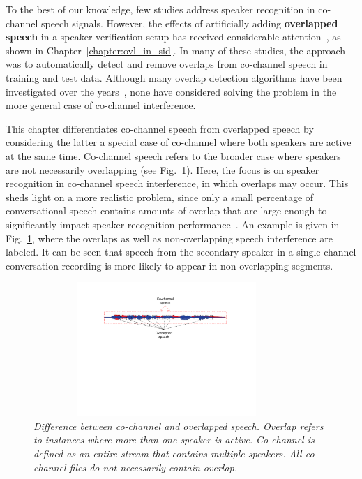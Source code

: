 To the best of our knowledge, few studies address speaker recognition in co-channel speech signals. 
However, the effects of artificially adding {\bf overlapped speech} in a speaker verification setup has received considerable attention~\cite{yantorno_report,yantorno_SID,Dwang_03}, as shown in Chapter~\ref{chapter:ovl_in_sid}. 
In many of these studies, the approach was to automatically detect and remove overlaps from co-channel speech in training and test data. 
Although many overlap detection algorithms have been investigated over the years~\cite{Boakye_icassp_08,nav_icassp13,smolenski_tut,sapvr_2000}, none have considered solving the problem in the more general case of co-channel interference. 

This chapter differentiates co-channel speech from overlapped speech by considering the latter a special case of co-channel where both speakers are active at the same time. 
Co-channel speech refers to the broader case where speakers are not necessarily overlapping (see Fig.~\ref{fig:cochannel_vs_overlap}). 
Here, the focus is on speaker recognition in co-channel speech interference, in which overlaps may occur.  
This sheds light on a more realistic problem, since only a small percentage of conversational speech contains amounts of overlap that are large enough to significantly impact speaker recognition performance~\cite{cetin_shriberg_06_icassp,smolenski_tut}. 
An example is given in Fig.~\ref{fig:cochannel_vs_overlap}, where the overlaps as well as non-overlapping speech interference are labeled. 
It can be seen that speech from the secondary speaker in a single-channel conversation recording is more likely to appear in non-overlapping segments. 

\begin{figure}[t!]
	\centering
	\vspace{0mm}
	\includegraphics[height = 2in, width=0.9\textwidth]{figures/cochannel_vs_overlap-crop}
	\vspace{-3mm}
	\caption{\it \small Difference between co-channel and overlapped speech. Overlap refers to instances where more than one speaker is active. Co-channel is defined as an entire stream that contains multiple speakers. All co-channel files do not necessarily contain overlap. }
	\label{fig:cochannel_vs_overlap}
	\vspace{-3mm}
\end{figure}


